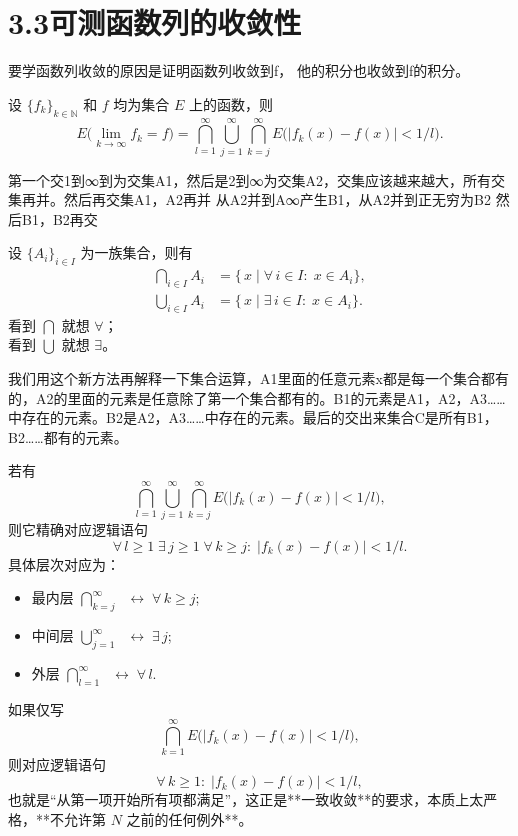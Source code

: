 \documentclass[lang=cn,10pt]{elegantbook}
\begin{document}
\section{3.3可测函数列的收敛性}
要学函数列收敛的原因是证明函数列收敛到f， 他的积分也收敛到f的积分。
\begin{lemma}[收敛点的集合]\label{lem:limit-point-set}
设 $\{f_k\}_{k\in\mathbb{N}}$ 和 $f$ 均为集合 $E$ 上的函数，则
\[
E\bigl(\lim_{k\to\infty}f_k = f\bigr)
=\bigcap_{l=1}^{\infty}
\bigcup_{j=1}^{\infty}
\bigcap_{k=j}^{\infty}
E\bigl(\lvert f_k(x)-f(x)\rvert<1/l\bigr).
\]
\end{lemma}
第一个交1到∞到为交集A1，然后是2到∞为交集A2，交集应该越来越大，所有交集再并。然后再交集A1，A2再并 从A2并到A∞产生B1，从A2并到正无穷为B2 然后B1，B2再交
\begin{dxtips}[交并集与量词对应]
设 $\{A_i\}_{i\in I}$ 为一族集合，则有
\begin{align*}
\bigcap_{i\in I}A_i
&=\{\,x\mid \forall\,i\in I:\;x\in A_i\},\\
\bigcup_{i\in I}A_i
&=\{\,x\mid \exists\,i\in I:\;x\in A_i\}.
\end{align*}
看到 $\bigcap$ 就想 $\forall$；\\
看到 $\bigcup$ 就想 $\exists$。
\end{dxtips}
我们用这个新方法再解释一下集合运算，A1里面的任意元素x都是每一个集合都有的，A2的里面的元素是任意除了第一个集合都有的。B1的元素是A1，A2，A3……中存在的元素。B2是A2，A3……中存在的元素。最后的交出来集合C是所有B1，B2……都有的元素。
\begin{proposition}[交并集与量词的对应示例]
若有
\[
\bigcap_{l=1}^{\infty}
\bigcup_{j=1}^{\infty}
\bigcap_{k=j}^{\infty}
E\bigl(\lvert f_k(x)-f(x)\rvert<1/l\bigr),
\]
则它精确对应逻辑语句
\[
\forall\,l\ge1\;\exists\,j\ge1\;\forall\,k\ge j:\;\lvert f_k(x)-f(x)\rvert<1/l.
\]
具体层次对应为：
\begin{itemize}
  \item 最内层\quad 
    $\displaystyle\bigcap_{k=j}^{\infty}\;$
    $\longleftrightarrow\;\forall\,k\ge j$;
  \item 中间层\quad 
    $\displaystyle\bigcup_{j=1}^{\infty}\;$
    $\longleftrightarrow\;\exists\,j$;
  \item 外层\quad 
    $\displaystyle\bigcap_{l=1}^{\infty}\;$
    $\longleftrightarrow\;\forall\,l$.
\end{itemize}
\end{proposition}
如果仅写
\[
\bigcap_{k=1}^{\infty}E\bigl(|f_k(x)-f(x)|<1/l\bigr),
\]
则对应逻辑语句
\[
\forall\,k\ge1:\;|f_k(x)-f(x)|<1/l,
\]
也就是“从第一项开始所有项都满足”，这正是**一致收敛**的要求，本质上太严格，**不允许第 \(N\) 之前的任何例外**。
\end{document}
